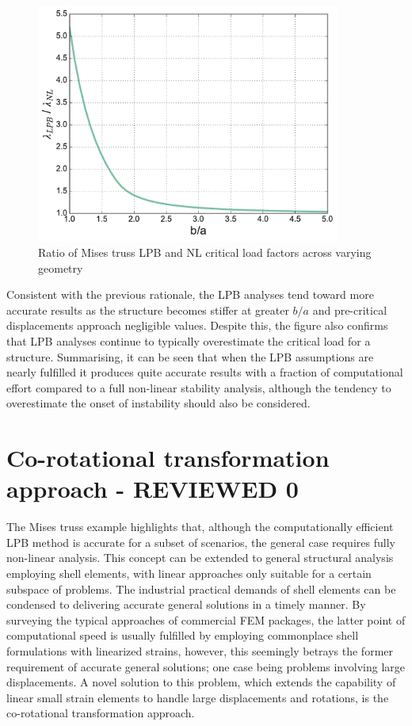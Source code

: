 \begin{figure}[H]
	\centering
	\def\svgwidth{\columnwidth}
	\includegraphics[width=10cm]{images/stability_analysis_mises_truss_lpb.pdf}
	\caption{Ratio of Mises truss LPB and NL critical load factors across varying geometry}
	\label{stab3}
\end{figure}

Consistent with the previous rationale, the LPB analyses tend toward more accurate results as the structure becomes stiffer at greater $b/a$ and pre-critical displacements approach negligible values. Despite this, the figure also confirms that LPB analyses continue to typically overestimate the critical load for a structure. Summarising, it can be seen that when the LPB assumptions are nearly fulfilled it produces quite accurate results with a fraction of computational effort compared to a full non-linear stability analysis, although the tendency to overestimate the onset of instability should also be considered. 

\section{Co-rotational transformation approach - REVIEWED 0}
The Mises truss example highlights that, although the computationally efficient LPB method is accurate for a subset of scenarios, the general case requires fully non-linear analysis. This concept can be extended to general structural analysis employing shell elements, with linear approaches only suitable for a certain subspace of problems. The industrial practical demands of shell elements can be condensed to delivering accurate general solutions in a timely manner. By surveying the typical approaches of commercial FEM packages, the latter point of computational speed is usually fulfilled by employing commonplace shell formulations with linearized strains, however, this seemingly betrays the former requirement of accurate general solutions; one case being problems involving large displacements. A novel solution to this problem, which extends the capability of linear small strain elements to handle large displacements and rotations, is the co-rotational transformation approach.

